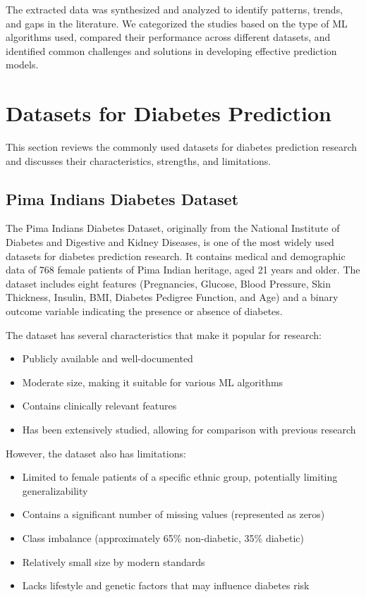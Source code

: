 \documentclass[journal]{IEEEtran}
\begin{document}
The extracted data was synthesized and analyzed to identify patterns, trends, and gaps in the literature. We categorized the studies based on the type of ML algorithms used, compared their performance across different datasets, and identified common challenges and solutions in developing effective prediction models.

\section{Datasets for Diabetes Prediction}
This section reviews the commonly used datasets for diabetes prediction research and discusses their characteristics, strengths, and limitations.

\subsection{Pima Indians Diabetes Dataset}
The Pima Indians Diabetes Dataset, originally from the National Institute of Diabetes and Digestive and Kidney Diseases, is one of the most widely used datasets for diabetes prediction research. It contains medical and demographic data of 768 female patients of Pima Indian heritage, aged 21 years and older. The dataset includes eight features (Pregnancies, Glucose, Blood Pressure, Skin Thickness, Insulin, BMI, Diabetes Pedigree Function, and Age) and a binary outcome variable indicating the presence or absence of diabetes.

The dataset has several characteristics that make it popular for research:
\begin{itemize}
    \item Publicly available and well-documented
    \item Moderate size, making it suitable for various ML algorithms
    \item Contains clinically relevant features
    \item Has been extensively studied, allowing for comparison with previous research
\end{itemize}

However, the dataset also has limitations:
\begin{itemize}
    \item Limited to female patients of a specific ethnic group, potentially limiting generalizability
    \item Contains a significant number of missing values (represented as zeros)
    \item Class imbalance (approximately 65\% non-diabetic, 35\% diabetic)
    \item Relatively small size by modern standards
    \item Lacks lifestyle and genetic factors that may influence diabetes risk
\end{itemize}
\end{document}

